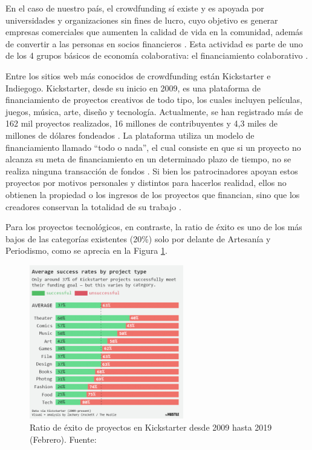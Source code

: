 En el caso de nuestro país, el crowdfunding sí existe y es apoyada por universidades y organizaciones sin fines de lucro, cuyo objetivo es generar empresas comerciales que aumenten la calidad de vida en la comunidad, además de convertir a las personas en socios financieros \parencite{cr_fernandezbedoya2020colecoperu}. Esta actividad es parte de uno de los 4 grupos básicos de economía colaborativa: el financiamiento colaborativo \parencite{cr_stokes2014coleco}.

Entre los sitios web más conocidos de crowdfunding están Kickstarter e Indiegogo. Kickstarter, desde su inicio en 2009, es una plataforma de financiamiento de proyectos creativos de todo tipo, los cuales incluyen películas, juegos, música, arte, diseño y tecnología. Actualmente, se han registrado más de 162 mil proyectos realizados, 16 millones de contribuyentes y 4,3 miles de millones de dólares fondeados \parencite{cr_kickstarter_about}. La plataforma utiliza un modelo de financiamiento llamado “todo o nada”, el cual consiste en que si un proyecto no alcanza su meta de financiamiento en un determinado plazo de tiempo, no se realiza ninguna transacción de fondos \parencite{cr_kickstarter_founding}. Si bien los patrocinadores apoyan estos proyectos por motivos personales y distintos para hacerlos realidad, ellos no obtienen la propiedad o los ingresos de los proyectos que financian, sino que los creadores conservan la totalidad de su trabajo \parencite{cr_kickstarter_press}.

Para los proyectos tecnológicos, en contraste, la ratio de éxito es uno de los más bajos de las categorías existentes (20\%) solo por delante de Artesanía y Periodismo, como se aprecia en la Figura \ref{1:fig2}.
\begin{figure}[h]
	\begin{center}
		\includegraphics[width=0.6\textwidth]{1/figures/kickstarter_success_rate_2009_2019.jpg}
		\caption{Ratio de éxito de proyectos en Kickstarter desde 2009 hasta 2019 (Febrero). Fuente: \cite{cr_hustle2019successrate}}
		\label{1:fig2}
	\end{center}
\end{figure}


